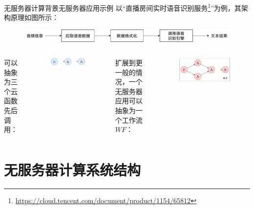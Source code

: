 \documentclass[aspectratio=169]{beamer}
\begin{document}
\begin{frame}{无服务器计算背景}{无服务器应用示例}
  以“直播房间实时语音识别服务\footnote{\url{https://cloud.tencent.com/document/product/1154/65812}}”为例，其架构原理如图所示：
  \begin{figure}
    \centering
    \includegraphics[width=\textwidth]{img/serverless-background/serverless-app-arch-1.pdf}
  \end{figure}

  \pause

  \begin{columns}
    可以抽象为三个云函数先后调用：
    \begin{figure}
      \centering
      \includegraphics[width=\textwidth]{img/serverless-background/serverless-app-arch-2.pdf}
    \end{figure}

    \pause

    扩展到更一般的情况，一个无服务器应用可以抽象为一个工作流 $WF$：
    \begin{figure}
      \centering
      \includegraphics[width=\textwidth]{img/serverless-background/serverless-app-arch-3.pdf}
    \end{figure}
  \end{columns}
\end{frame}

\section{无服务器计算系统结构}
\end{document}
